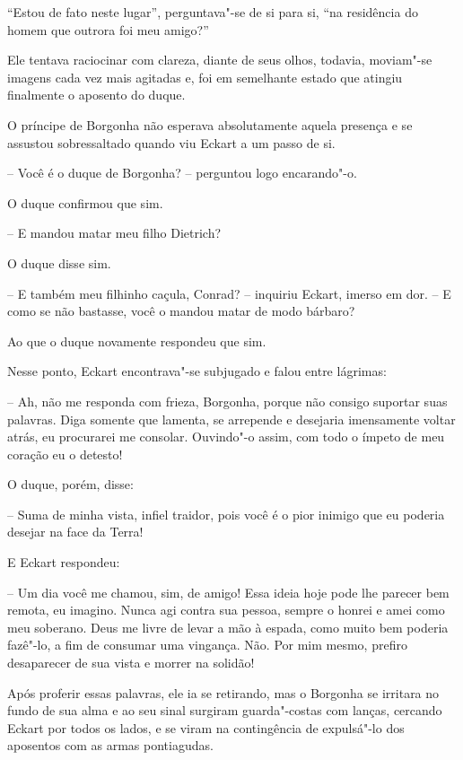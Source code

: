 ``Estou de fato neste lugar'', perguntava"-se de si para si, ``na residência
do homem que outrora foi meu amigo?''

Ele tentava raciocinar com clareza, diante de seus olhos, todavia,
moviam"-se imagens cada vez mais agitadas e, foi em semelhante estado
que atingiu finalmente o aposento do duque.

O príncipe de Borgonha não esperava absolutamente aquela presença e se
assustou sobressaltado quando viu Eckart a um passo de si.

-- Você é o duque de Borgonha? -- perguntou logo encarando"-o.

O duque confirmou que sim. 

-- E mandou matar meu filho Dietrich? 

O duque disse sim. 

-- E também meu filhinho caçula, Conrad? -- inquiriu Eckart, imerso
em dor. -- E como se não bastasse, você o mandou matar de modo bárbaro? 

Ao que o duque novamente respondeu que sim.

Nesse ponto, Eckart encontrava"-se subjugado e falou entre lágrimas:

 -- Ah, não me responda com frieza, Borgonha, porque não consigo suportar
suas palavras. Diga somente que lamenta, se arrepende e desejaria
imensamente voltar atrás, eu procurarei me consolar. Ouvindo"-o assim,
com todo o ímpeto de meu coração eu o detesto!

O duque, porém, disse:

-- Suma de minha vista, infiel traidor, pois você é o pior inimigo que eu
poderia desejar na face da Terra!

E Eckart respondeu:

-- Um dia você me chamou, sim, de amigo! Essa ideia hoje pode lhe parecer
bem remota, eu imagino. Nunca agi contra sua pessoa, sempre o honrei e
amei como meu soberano. Deus me livre de levar a mão à espada, como
muito bem poderia fazê"-lo, a fim de consumar uma vingança. Não. Por mim
mesmo, prefiro desaparecer de sua vista e morrer na solidão!

Após proferir essas palavras, ele ia se retirando, mas o Borgonha se
irritara no fundo de sua alma e ao seu sinal surgiram guarda"-costas com
lanças, cercando Eckart por todos os lados, e se viram na contingência
de expulsá"-lo dos aposentos com as armas pontiagudas.

